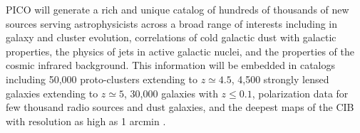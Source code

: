 \documentclass[PICOAPC.tex]{subfiles}
\begin{document}

PICO will generate a rich and unique catalog of hundreds of thousands of new sources serving astrophysicists across a broad range of interests including in galaxy and cluster evolution, correlations of cold galactic dust with galactic properties, the physics of jets in active galactic nuclei, and the properties of the cosmic infrared background. This information will be embedded in catalogs including 50,000 proto-clusters extending to $z\simeq 4.5$, 4,500 strongly lensed galaxies extending to $z\simeq 5$, 30,000 galaxies with $z\leq 0.1$, polarization data for few thousand radio sources and dust galaxies, and the deepest maps of the CIB with resolution as high as 1 arcmin . 
\end{document}
